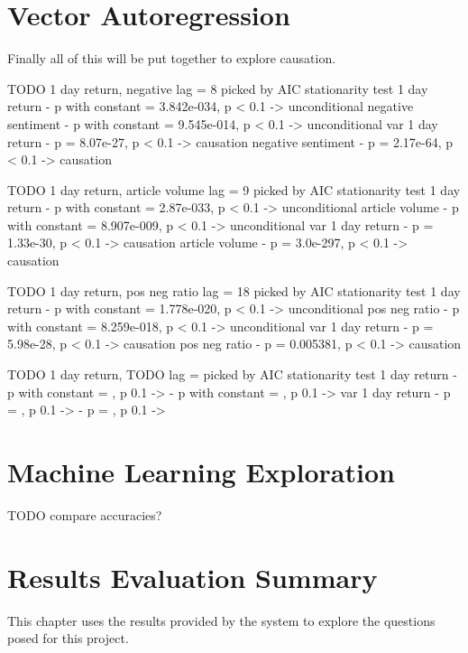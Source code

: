\section{Vector Autoregression}

Finally all of this will be put together to explore causation.

TODO 1 day return, negative
lag = 8 picked by AIC
stationarity test
1 day return - p with constant = 3.842e-034, p < 0.1 -> unconditional
negative sentiment - p with constant = 9.545e-014, p < 0.1 -> unconditional
var
1 day return - p = 8.07e-27, p < 0.1 -> causation
negative sentiment - p = 2.17e-64, p < 0.1 -> causation

TODO 1 day return, article volume
lag = 9 picked by AIC
stationarity test
1 day return - p with constant = 2.87e-033, p < 0.1 -> unconditional
article volume - p with constant = 8.907e-009, p < 0.1 -> unconditional
var
1 day return - p = 1.33e-30, p < 0.1 -> causation
article volume - p = 3.0e-297, p < 0.1 -> causation

TODO 1 day return, pos neg ratio
lag = 18 picked by AIC
stationarity test
1 day return - p with constant = 1.778e-020, p < 0.1 -> unconditional
pos neg ratio - p with constant = 8.259e-018, p < 0.1 -> unconditional
var
1 day return - p = 5.98e-28, p < 0.1 -> causation
pos neg ratio - p = 0.005381, p < 0.1 -> causation

TODO 1 day return, TODO
lag =  picked by AIC
stationarity test
1 day return - p with constant = , p  0.1 -> 
 - p with constant = , p  0.1 -> 
var
1 day return - p = , p  0.1 -> 
 - p = , p  0.1 -> 

\section{Machine Learning Exploration}

TODO compare accuracies?

\section{Results Evaluation Summary}

This chapter uses the results provided by the system to explore the questions posed for this project.